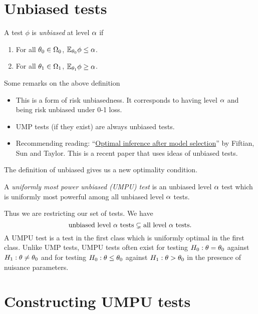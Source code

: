 \section{Unbiased tests}
\begin{defn}
    A test $\phi$ is \emph{unbiased} at level ${\alpha}$ if
    \begin{enumerate}
        \item For all ${\theta}_0 \in {{\Omega}}_0$, ${\mathbb{E}}_{{\theta}_0} \phi \le {\alpha}$.
        \item For all ${\theta}_1 \in {{\Omega}}_1$, ${\mathbb{E}}_{{\theta}_1} \phi \ge {\alpha}$.
    \end{enumerate}
\end{defn}
\begin{remark}
    Some remarks on the above definition
    \begin{itemize}
        \item This is a form of risk unbiasedness. It corresponds to having level ${\alpha}$ and being risk unbiased under 0-1 loss.
        \item UMP tests (if they exist) are always unbiased tests.
        \item Recommending reading: ``\href{https://arxiv.org/abs/1410.2597}{Optimal inference after model selection}'' by Fiftian, Sun and Taylor. This is a recent paper that uses ideas of unbiased tests.
    \end{itemize}
\end{remark}
The definition of unbiased gives us a new optimality condition. 
\begin{defn}
    A \emph{uniformly most power unbiased (UMPU) test} is an unbiased level ${\alpha}$ test which is uniformly most powerful among all unbiased level ${\alpha}$ tests.
\end{defn}
Thus we are restricting our set of tests. We have 
\[\text{unbiased level ${\alpha}$ tests} \subsetneq \text{all level ${\alpha}$ tests}. \]
A UMPU test is a test in the first class which is uniformly optimal in the first class. Unlike UMP tests, UMPU tests often exist for testing $H_0 : {\theta} ={\theta}_0$ against $H_1 : {\theta} \neq {\theta}_0$ and for testing $H_0 : {\theta} \le {\theta}_0$ against $H_1 : {\theta} > {\theta}_0$ in the presence of nuisance parameters.
\section{Constructing UMPU tests}
